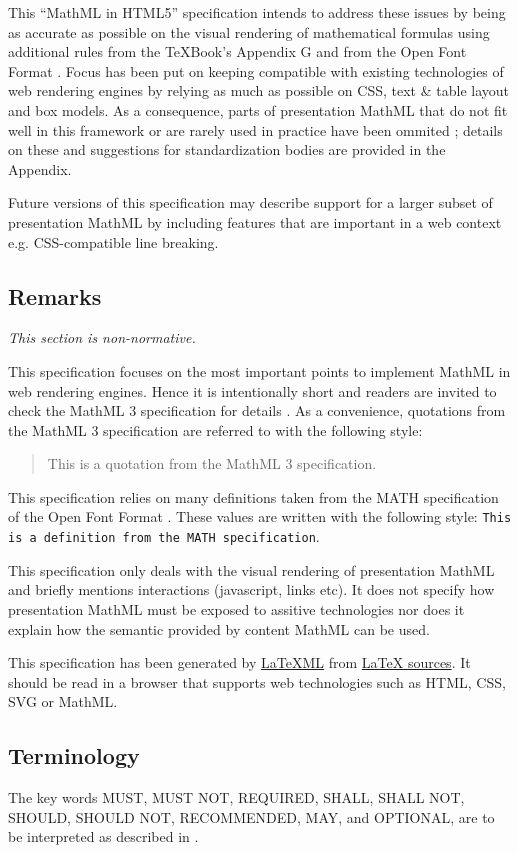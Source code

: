 This ``MathML in HTML5'' specification intends to address these issues by being
as accurate as
possible on the visual rendering of mathematical formulas using additional
rules from the \TeX Book's Appendix G \cite{TeXBook} and from
the Open Font Format \cite{OpenFontFormat3}.
Focus has been put on keeping compatible with existing technologies of web
rendering engines \cite{HTML5} by relying as much as possible on CSS, text \&
table layout and box models. As a consequence, parts of presentation MathML
that do not fit well in this framework or are rarely used in practice
have been ommited ; details on these and suggestions for standardization bodies
are provided in the Appendix.

Future versions of this specification may describe support for a larger subset
of presentation MathML by including features that are important in a web context
e.g. CSS-compatible line breaking.

\subsection{Remarks}

{\em This section is non-normative.}

This specification focuses on the most important points to implement
MathML in web rendering engines. Hence it is intentionally short and readers are
invited to check the MathML 3 specification for details \cite{MathML3}.
As a convenience, quotations from the MathML 3 specification are referred to
with the following style:
\begin{quote}
  This is a quotation from the MathML 3 specification.
\end{quote}

This specification relies on many definitions taken from the MATH specification
of the Open Font Format \cite{OpenFontFormat3}. These values are written with
the following style:
{\tt This is a definition from the MATH specification}.

This specification only deals with the visual rendering of presentation MathML
and briefly mentions interactions (javascript, links etc). It does not specify
how presentation MathML must be exposed to assitive technologies nor does it
explain how the semantic provided by content MathML can be used.

This specification has been generated by
\href{http://dlmf.nist.gov/LaTeXML/}{LaTeXML} from
\href{https://github.com/MathML/MathMLinHTML5}{LaTeX sources}. It
should be read in a browser that supports web technologies
such as HTML, CSS, SVG or MathML.

\subsection{Terminology}

The key words MUST, MUST NOT, REQUIRED, SHALL, SHALL NOT, SHOULD, SHOULD NOT,
RECOMMENDED, MAY, and OPTIONAL, are to be interpreted as described in
\cite{IETF RFC 2119}.
